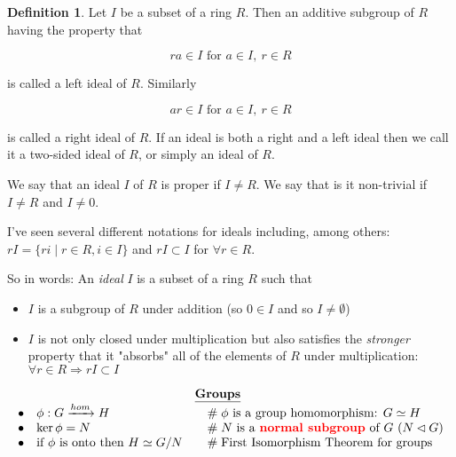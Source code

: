 \documentclass{article}
\theoremstyle{definition}
\newtheorem{definition}{Definition}[section]
\begin{document}
\begin{definition}
Let $I$ be a subset of a ring $R$. Then an additive subgroup of $R$ having the property that

\begin{equation*}
ra \in I \text{ for }  a \in I, \: r \in R
\end{equation*}

\bigskip
\noindent
is called a left ideal of $R$.  Similarly

\begin{equation*}
ar \in I \text{ for }  a \in I, \: r \in R
\end{equation*}

\bigskip
\noindent
is called a right ideal of $R$. If an ideal is both a right and a left ideal then we call it a two-sided ideal of $R$, or simply an ideal of $R$.
\end{definition}

\noindent
 We say that an ideal $I$ of $R$ is proper if $I \neq R$.  We say that is it non-trivial if $I \neq R$ and  $I \neq  0$.

\bigskip
\noindent
I've seen several different notations for ideals including, among others:  $rI = \{ri \mid r \in R, i \in I\}$ and 
$rI \subset I$ for $\forall r \in R$. 

\bigskip
\noindent
So in words: An \emph{ideal} $I$ is a subset of a ring $R$ such that

\begin{itemize}
\item $I$ is a subgroup of $R$ under addition (so $0 \in I$ and so $I \neq \emptyset$) 
\item $I$  is not only closed under multiplication but also satisfies the \emph{stronger} property that it  
"absorbs" all of the elements of $R$ under multiplication: $\forall r \in R \Rightarrow rI \subset I$
\end{itemize}

\bigskip
\bigskip
\begin{mybox}
\begin{equation*}
\begin{array}{lllll}
&& \underline{\mathbf{Groups}} \\ 
\bullet&  \phi: G \xrightarrow{hom} H                            &\quad  \mathrel{\#} \text{$\phi$ is a group homomorphism: $G \simeq H$}                               \\
\bullet&  \ker \phi = N                                                    &\quad  \mathrel{\#} \text{$N$ is a \textbf{{\color{red} normal subgroup}} of $G$ ($N \lhd G$)}  \\
\bullet&  \text{if $\phi$ is onto then $H \simeq G/N$}   &\quad \mathrel{\#} \text{First Isomorphism Theorem for groups}                                                \\
\end{array}
\end{equation*}
\end{mybox}
\end{document}
